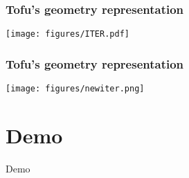 \documentclass[10pt]{beamer}
\begin{document}
\begin{frame}
\frametitle{Tofu's geometry representation}

\begin{center}
	\texttt{[image: figures/ITER.pdf]}
\end{center}

\end{frame}

\begin{frame}
\frametitle{Tofu's geometry representation}

\begin{center}
	\texttt{[image: figures/newiter.png]}
\end{center}

\end{frame}

\section{Demo}

{
\begin{frame}[standout]
  Demo
\end{frame}
}

%
%
\end{document}

